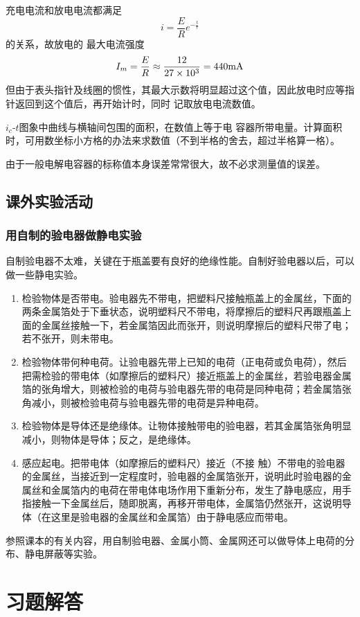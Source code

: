 充电电流和放电电流都满足
\[i=\frac{E}{R}e^{-\frac{t}{r}}\]的关系，故放电的
最大电流强度
\[I_m=\frac{E}{R}\approx \frac{12}{ 27\times10^3}=440{\rm mA}\]但由于表头指针及线圈的惯性，其最大示数将明显超过这个值，因此放电时应等指针返回到这个值后，再开始计时，同时
记取放电电流数值。

$i_c$-$t$图象中曲线与横轴间包围的面积，在数值上等于电
容器所带电量。计算面积时，可用数坐标小方格的办法来求数值（不到半格的舍去，超过半格算一格）。

由于一般电解电容器的标称值本身误差常常很大，故不必求测量值的误差。

\subsection{课外实验活动}
\subsubsection{用自制的验电器做静电实验}

自制验电器不太难，关键在于瓶盖要有良好的绝缘性能。自制好验电器以后，可以做一些静电实验。

\begin{enumerate}
    \item 检验物体是否带电。验电器先不带电，把塑料尺接触瓶盖上的金属丝，下面的两条金属箔处于下垂状态，说明塑料尺不带电，将摩擦后的塑料尺再跟瓶盖上面的金属丝接触一下，若金属箔因此而张开，则说明摩擦后的塑料尺带了电；若不张开，则未带电。
    \item 检验物体带何种电荷。让验电器先带上已知的电荷（正电荷或负电荷），然后把需检验的带电体（如摩擦后的塑料尺）接近瓶盖上的金属丝，若验电器金属箔的张角增大，则被检验的电荷与验电器先带的电荷是同种电荷；若金属箔张角减小，则被检验电荷与验电器先带的电荷是异种电荷。    
    \item 检验物体是导体还是绝缘体。让物体接触带电的验电器，若其金属箔张角明显减小，则物体是导体；反之，是绝缘体。
    \item 感应起电。把带电体（如摩擦后的塑料尺）接近（不接
    触）不带电的验电器的金属丝，当接近到一定程度时，验电器的金属箔张开，说明此时验电器的金属丝和金属箔内的电荷在带电体电场作用下重新分布，发生了静电感应，用手指接触一下金属丝后，随即脱离，再移开带电体，金属箔仍然张开，这说明导体（在这里是验电器的金属丝和金属箔）由于静电感应而带电。
\end{enumerate}

    参照课本的有关内容，用自制验电器、金属小筒、金属网还可以做导体上电荷的分布、静电屏蔽等实验。

\section{习题解答}
